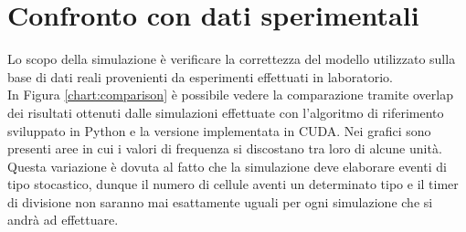 \section{Confronto con dati sperimentali}

Lo scopo della simulazione è verificare la correttezza del modello utilizzato
sulla base di dati reali provenienti da esperimenti effettuati in laboratorio.
\\
In Figura \ref{chart:comparison} è possibile vedere la comparazione tramite 
overlap dei
risultati ottenuti dalle simulazioni effettuate con l'algoritmo di riferimento 
sviluppato in Python e la versione implementata in CUDA.
Nei grafici sono presenti aree in cui
i valori di frequenza si discostano tra loro di alcune unità. Questa variazione
è dovuta al fatto che la simulazione deve elaborare eventi di tipo stocastico,
dunque il numero di cellule aventi un determinato tipo e il timer di divisione
non saranno mai esattamente uguali per ogni simulazione che si andrà ad
effettuare. 

